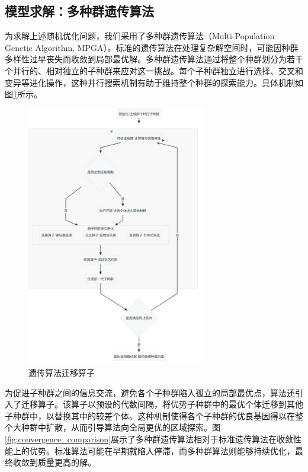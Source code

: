 \subsection{模型求解：多种群遗传算法}
为求解上述随机优化问题，我们采用了多种群遗传算法（Multi-Population Genetic Algorithm, MPGA）。标准的遗传算法在处理复杂解空间时，可能因种群多样性过早丧失而收敛到局部最优解。多种群遗传算法通过将整个种群划分为若干个并行的、相对独立的子种群来应对这一挑战。每个子种群独立进行选择、交叉和变异等进化操作，这种并行搜索机制有助于维持整个种群的探索能力。具体机制如图\ref{fig:transfer_operator}所示。

\begin{figure}[H]
	\centering
	\includegraphics[width=0.7\textwidth]{figs/4问题二/多种群遗传算法.png}
	\caption{遗传算法迁移算子}
	\label{fig:transfer_operator}
\end{figure}



为促进子种群之间的信息交流，避免各个子种群陷入孤立的局部最优点，算法还引入了迁移算子。该算子以预设的代数间隔，将优势子种群中的最优个体迁移到其他子种群中，以替换其中的较差个体。这种机制使得各个子种群的优良基因得以在整个大种群中扩散，从而引导算法向全局更优的区域探索。图\ref{fig:convergence_comparison}展示了多种群遗传算法相对于标准遗传算法在收敛性能上的优势。标准算法可能在早期就陷入停滞，而多种群算法则能够持续优化，最终收敛到质量更高的解。

